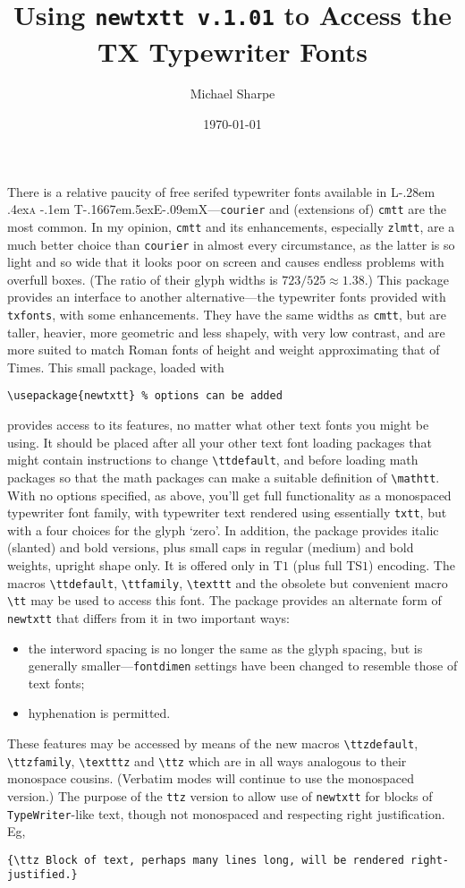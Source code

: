 \documentclass{article}
\title{Using \texttt{newtxtt v.1.01} to Access the TX Typewriter Fonts}
\author{Michael Sharpe}
\date{\today}  %
\makeatletter
\def\TeX{T\kern-.1667em\lower.5ex\hbox{E}\kern-.09emX\@}
\DeclareRobustCommand{\LaTeX}{L\kern-.28em%
\raise.4ex\hbox{\textsc{a}}%
        \kern-.1em%
        \TeX}
\makeatother
\begin{document}
\maketitle
There is a relative paucity of free serifed typewriter fonts available in \LaTeX---{\tt courier}
 and (extensions of) {\tt cmtt} are the most common.  In my opinion, {\tt cmtt} and its enhancements, especially {\tt zlmtt}, are a much better choice than {\tt courier} in almost every circumstance, as the latter is so light and so wide that it looks poor on screen and causes endless problems with overfull boxes. (The ratio of their glyph widths is $723/525\approx1.38$.) This package provides an interface to another alternative---the typewriter fonts provided with {\tt txfonts}, with some enhancements. They have the same widths as {\tt cmtt}, but are taller, heavier, more geometric and less shapely, with  very low contrast, and are more suited to match Roman fonts of height and weight approximating that of Times. This small package, loaded with
\begin{verbatim}
\usepackage{newtxtt} % options can be added
\end{verbatim}
provides access to its features, no matter what other text fonts you might be using. It should be placed after all your other text font loading packages that might contain instructions to change \verb|\ttdefault|, and before loading math packages so that the math packages can make a suitable definition of \verb|\mathtt|. With no options specified, as above, you'll get full functionality as a monospaced typewriter font family, with typewriter text rendered using essentially {\tt txtt}, but with a four choices for the glyph  `zero'. In addition, the package  provides italic (slanted) and bold versions, plus small caps in regular (medium) and bold weights, upright shape only. It is offered  only in T$1$ (plus full TS$1$) encoding. The macros \verb|\ttdefault|, \verb|\ttfamily|, \verb|\texttt| and the obsolete but convenient macro \verb|\tt| may be used to access this font. 
 The package provides an alternate form of {\tt newtxtt} that differs from it in two important ways:
 \begin{itemize}
 \item 
 the interword spacing is no longer the same as the glyph spacing, but is generally smaller---{\tt fontdimen} settings have been changed to resemble those of text fonts;
  \item
 hyphenation is permitted.
 \end{itemize}
These features may be accessed by means of the new macros \verb|\ttzdefault|, \verb|\ttzfamily|, \verb|\textttz| and  \verb|\ttz| which are in all ways analogous to their monospace cousins. (Verbatim modes will continue to use the monospaced version.) The purpose of the {\tt ttz} version to allow use of \texttt{newtxtt} for blocks of {\tt TypeWriter}-like text, though not monospaced and respecting  right justification. Eg,
\begin{verbatim}
{\ttz Block of text, perhaps many lines long, will be rendered right-justified.}
\end{verbatim}
\end{document}
